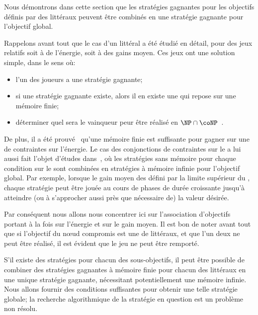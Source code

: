 \bigskip

Nous démontrons dans cette section que les stratégies gagnantes pour les objectifs définis par des littéraux peuvent être combinés en une stratégie gagnante pour l'objectif global.

Rappelons avant tout que le cas d'un littéral a été étudié en détail, pour des jeux relatifs soit à de l'énergie, soit à des gains moyen.
Ces jeux ont une solution simple, dans le sens où:
\begin{itemize}
    \item l'un des joueurs a une stratégie gagnante;
    \item si une stratégie gagnante existe, alors il en existe une qui repose sur une mémoire finie;
    \item déterminer quel sera le  vainqueur peur être réalisé en $\NP\cap \coNP$~\cite{zwick96}.
\end{itemize}
De plus, il a été prouvé~\cite{velner12a} qu'une mémoire finie est suffisante pour gagner sur une  de contraintes sur l'énergie.
Le cas des conjonctions de contraintes sur le  a lui aussi fait l'objet d'études dans~\cite{velner12a}, où les stratégies sans mémoire pour chaque condition sur le  sont combinées en stratégies à mémoire infinie pour l'objectif global.
Par exemple, lorsque le gain moyen des défini par la limite supérieur du , chaque stratégie peut être jouée au cours de phases de durée croissante jusqu'à atteindre (ou à s'approcher aussi près que nécessaire de) la valeur désirée.

Par conséquent nous allons nous concentrer ici sur l'association d'objectifs portant à la fois sur l'énergie et sur le gain moyen.
Il est bon de noter avant tout que si l'objectif du nœud compromis est une  de littéraux, et que l'un deux ne peut être réalisé, il est évident que le jeu ne peut être remporté.

S'il existe des stratégies pour chacun des sous-objectifs, il peut être possible de combiner des stratégies gagnantes à mémoire finie pour chacun des littéraux en une unique stratégie gagnante, nécessitant potentiellement une mémoire infinie.
Nous allons fournir des conditions suffisantes pour obtenir une telle stratégie globale; la recherche algorithmique de la stratégie en question est un problème non résolu.

